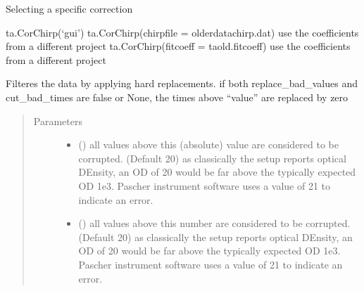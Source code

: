 \documentclass[letterpaper,10pt,english]{sphinxmanual}
\begin{document}
\begin{fulllineitems}
\begin{fulllineitems}
Selecting a specific correction

\begin{sphinxVerbatim}[commandchars=\\\{\}]
\PYGZgt{}\PYGZgt{}\PYGZgt{} ta.Cor\PYGZus{}Chirp(‘gui’)
\PYGZgt{}\PYGZgt{}\PYGZgt{} ta.Cor\PYGZus{}Chirp(chirp\PYGZus{}file = \PYGZsq{}older\PYGZus{}data\PYGZus{}chirp.dat\PYGZsq{})
\PYGZgt{}\PYGZgt{}\PYGZgt{} \PYGZsh{}use the coefficients from a different project
\PYGZgt{}\PYGZgt{}\PYGZgt{} ta.Cor\PYGZus{}Chirp(fitcoeff = ta\PYGZus{}old.fitcoeff) \PYGZsh{}use the coefficients from a different project
\end{sphinxVerbatim}

\end{fulllineitems}


\begin{fulllineitems}
\label{\detokenize{plot_func:plot_func.TA.Filter_data}}
Filteres the data by applying hard replacements. if both replace\_bad\_values and
cut\_bad\_times are false or None, the times above “value” are replaced by zero
\begin{quote}\begin{description}
\item[{Parameters}] \leavevmode\begin{itemize}
\item {} 
 (\sphinxstyleliteralemphasis{\sphinxupquote{, }}) \textendash{} all values above this (absolute) value are considered to be corrupted. (Default 20) as classically the setup
reports optical DEnsity, an OD of 20 would be far above the typically expected
OD 1e\sphinxhyphen{}3. Pascher instrument software uses a value of 21 to indicate an error.

\item {} 
 (\sphinxstyleliteralemphasis{\sphinxupquote{, }}) \textendash{} all values above this number are considered to be corrupted. (Default 20) as classically the setup
reports optical DEnsity, an OD of 20 would be far above the typically expected
OD 1e\sphinxhyphen{}3. Pascher instrument software uses a value of 21 to indicate an error.


\end{itemize}
\end{description}
\end{quote}
\end{fulllineitems}
\end{fulllineitems}
\end{document}
